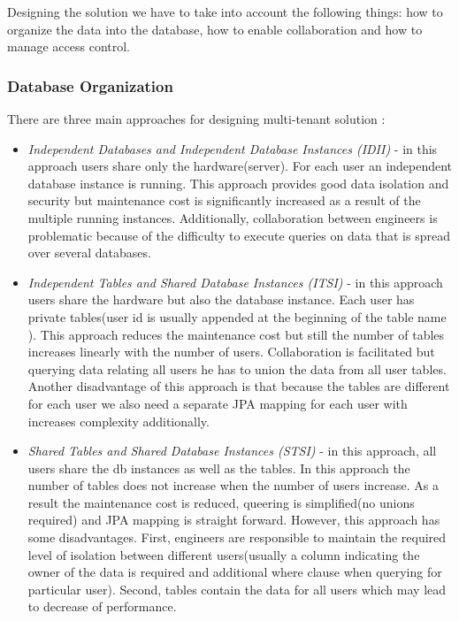 Designing the solution we have to take into account the following things: how to organize the data into the database, how to enable collaboration and how to manage access control.

\subsubsection{Database Organization}
There are three main approaches for designing multi-tenant solution \cite{Hui}:

\begin{itemize}
	\item \textit{Independent Databases and Independent Database Instances (IDII)} - in this approach users share only the hardware(server). For each user an independent database instance is running. This approach provides good data isolation and security but maintenance cost is significantly increased as a result of the multiple running instances. Additionally, collaboration between engineers is problematic because of the difficulty to execute queries on data that is spread over several databases.  
	
	\item \textit{Independent Tables and Shared Database Instances (ITSI)} - in this approach users share the hardware but also the database instance. Each user has private tables(user id is usually appended at the beginning of the table name \cite{Hui}). This approach reduces the maintenance cost but still the number of tables increases linearly with the number of users. Collaboration is facilitated but querying data relating all users he has to union the data from all user tables. Another disadvantage of this approach is that because the tables are different for each user we also need a separate JPA mapping for each user with increases complexity additionally.
	
	\item \textit{Shared Tables and Shared Database Instances (STSI)} - in this approach, all users share the db instances as well as the tables. In this approach the number of tables does not increase when the number of users increase. As a result the maintenance cost is reduced, queering is simplified(no unions required) and JPA mapping is straight forward. However, this approach has some disadvantages. First, engineers are responsible to maintain the required level of isolation between different users(usually a column indicating the owner of the data is required and additional where clause when querying for particular user). Second, tables contain the data for all users which may lead to decrease of performance.
	
\end{itemize}


